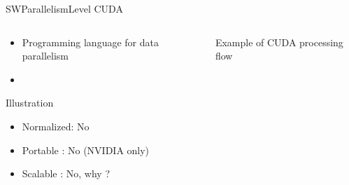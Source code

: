 %
\begin{Frame}{SWParallelismLevel CUDA}
  \begin{columns}[t]
    \begin{column}{5cm} %
      \begin{block}{}
        \begin{itemize}
        \item Programming language for data parallelism
        \item \href{https://en.wikipedia.org/wiki/CUDA}{}
        \end{itemize}
      \end{block} 
      \begin{alertblock}{Illustration}
        \begin{itemize}
        \item Normalized: No 
        \item Portable : No (NVIDIA only)
        \item Scalable : No, why ?
        \end{itemize}

      \end{alertblock}   
    \end{column}
    
    \begin{column}{5cm} %
      \begin{block}{Example of CUDA processing flow }
      \end{block}
    \end{column}
  \end{columns}  
\end{Frame}


